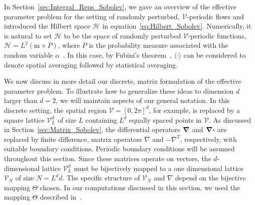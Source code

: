\documentclass[english,12pt,jmp,graphicx]{revtex4-1}
\newcommand{\vecu}{\boldsymbol{u}}
\newcommand{\secref}[1]{Section~\ref{#1}}
\newcommand{\bnabla}{\mbox{\boldmath${\nabla}$}}
\newcommand{\bcdot}{\mbox{\boldmath${\cdot}$}}
\newcommand{\Vc}{\mathcal{V}}
\newcommand{\Hs}{\mathscr{H}}
\begin{document}
In \secref{sec:Integral_Reps_Sobolev}, we gave an overview of the effective
parameter problem for the setting of randomly perturbed, $\Vc$-periodic
flows and introduced the Hilbert space $\Hs$
in equation~\eqref{eq:Hilbert_Sobolev}. Numerically, it 
is natural to set $\Hs$ to be the space of randomly perturbed 
$\Vc$-periodic functions, $\Hs=L^2(\text{m}\times
P)$, where $P$ is the probability measure associated with the random 
variable $\alpha$~\cite{Khoshnevisan:2007:Prob}. In this case, by Fubini's
theorem~\cite{Folland:99:RealAnalysis}, $\langle\cdot\rangle$ can be
considered to denote spatial averaging followed by statistical
averaging.




We now discuss in more detail our discrete, matrix formulation of the
effective parameter problem. To illustrate 
how to generalize these ideas to dimension $d$ larger than $d=2$, we
will maintain aspects of our general 
notation. In this discrete setting, the spatial region $\Vc=[0,2\pi]^d$,
for example, is replaced by a square lattice $\Vc_L^d$ of size $L$
containing $L^d$ equally spaced points in $\Vc$. As discussed
in \secref{sec:Matrix_Sobolev}, 
the differential operators $\bnabla$ and $\bnabla\bcdot$ are replaced
by finite difference, matrix operators $\nabla$ and $-\nabla^T$, respectively,
with suitable boundary conditions. Periodic boundary conditions will
be assumed throughout this section. Since these matrices operate on
vectors, the $d$-dimensional lattice $\Vc_L^d$ must be bijectively
mapped to a one dimensional lattice $\Vc_N$ of size
$N=L^dd$. The specific structure of
$\Vc_N$ and $\nabla$ depend on the bijective mapping $\Theta$ chosen. In our
computations discussed in this section, we used the mapping $\Theta$
described in~\cite{Murphy:2015:CMS:13:4:825}.
\end{document}
